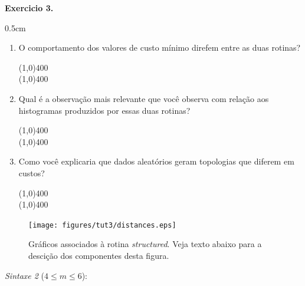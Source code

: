 \begin{refsection}
\begin{blackBlock}{\textbf{Exercicio 3.}}
\begin {myindentpar}{0.5cm}
\begin{enumerate}[\itshape i.]
 \item{O comportamento dos valores de custo mínimo direfem entre as duas rotinas?}\\
  \begin{center}
  \line(1,0){400}\\
  \line(1,0){400}\\
  \end{center}

 \item{Qual é a observação mais relevante que você observa com relação aos histogramas produzidos por essas duas rotinas?}\\
  \begin{center}
  \line(1,0){400}\\
  \line(1,0){400}\\
  \end{center}

 \item{Como você explicaria que dados aleatórios geram topologias que diferem em custos?}\\
  \begin{center}
  \line(1,0){400}\\
  \line(1,0){400}\\
  \end{center}

\end{enumerate}
\end{myindentpar}

\end{blackBlock}


  \begin{figure}[H]
      {\texttt{[image: figures/tut3/distances.eps]}}
      {\caption[\textit{\textit{random space} }]{Gráficos associados à rotina \textit{structured}. Veja texto abaixo para a descição dos componentes desta figura.}\label{tut3:fig:distances}}
  \end{figure}


\indent\textit{Sintaxe 2} ($4 \leq m \leq 6$): \\
\indent\indent\indent{}\\


\end{refsection}
